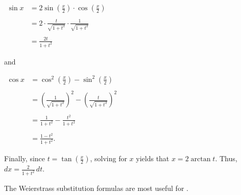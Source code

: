 \documentclass[12pt]{article}
\begin{document}
\begin{center}
$\begin{array}{rl}
\sin x & =\displaystyle 2\sin\left( \frac{x}{2} \right)\cdot \cos\left( \frac{x}{2} \right) \\
& \\
& =\displaystyle 2 \cdot \frac{t}{\sqrt{1+t^2}} \cdot \frac{1}{\sqrt{1+t^2}} \\
& \\
& =\displaystyle \frac{2t}{1+t^2}
\end{array}$
\end{center}

and

\begin{center}
$\begin{array}{rl}
\cos x & =\displaystyle \cos^2\left( \frac{x}{2} \right)-\sin^2\left( \frac{x}{2} \right) \\
& \\
& =\displaystyle \left( \frac{1}{\sqrt{1+t^2}} \right)^2-\left( \frac{t}{\sqrt{1+t^2}} \right)^2 \\
& \\
& =\displaystyle \frac{1}{1+t^2}-\frac{t^2}{1+t^2} \\
& \\
& =\displaystyle \frac{1-t^2}{1+t^2}.
\end{array}$
\end{center}

Finally, since $\displaystyle t=\tan\left( \frac{x}{2} \right)$, solving for $x$ yields that $x=2\arctan t$.  Thus, $\displaystyle dx=\frac{2}{1+t^2} \, dt$.

The Weierstrass substitution formulas are most useful for .
\end{document}

